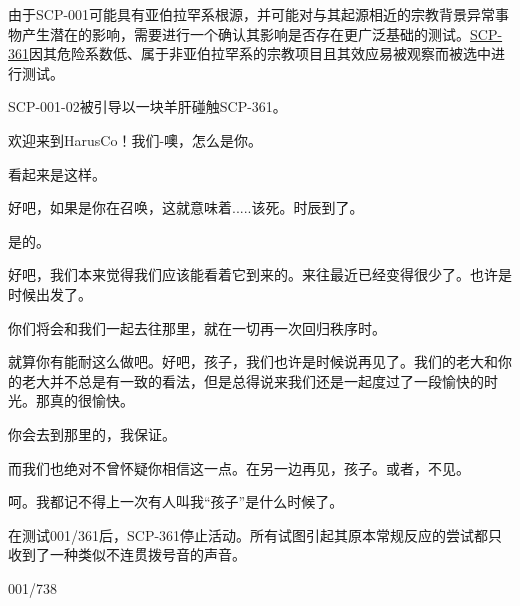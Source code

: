 \begin{scpbox}

 由于SCP-001可能具有亚伯拉罕系根源，并可能对与其起源相近的宗教背景异常事物产生潜在的影响，需要进行一个确认其影响是否存在更广泛基础的测试。\hyperref[chhap:SCP-361]{SCP-361}因其危险系数低、属于非亚伯拉罕系的宗教项目且其效应易被观察而被选中进行测试。

\begin{scpbox}


SCP-001-02被引导以一块羊肝碰触SCP-361。

 欢迎来到HarusCo！我们-噢，怎么是你。

 看起来是这样。

 好吧，如果是你在召唤，这就意味着.....该死。时辰到了。

 是的。

 好吧，我们本来觉得我们应该能看着它到来的。来往最近已经变得很少了。也许是时候出发了。

 你们将会和我们一起去往那里，就在一切再一次回归秩序时。

 就算你有能耐这么做吧。好吧，孩子，我们也许是时候说再见了。我们的老大和你的老大并不总是有一致的看法，但是总得说来我们还是一起度过了一段愉快的时光。那真的很愉快。

 你会去到那里的，我保证。

 而我们也绝对不曾怀疑你相信这一点。在另一边再见，孩子。或者，不见。

 呵。我都记不得上一次有人叫我“孩子”是什么时候了。


\end{scpbox}

在测试001/361后，SCP-361停止活动。所有试图引起其原本常规反应的尝试都只收到了一种类似不连贯拨号音的声音。

\end{scpbox}

001/738

